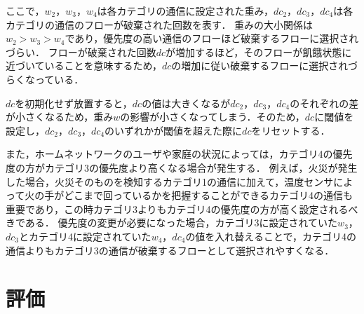 \documentclass[a4paper,11pt,uplatex]{ujreport}
\begin{document}
  ここで，$w_2$，$w_3$，$w_4$は各カテゴリの通信に設定された重み，$dc_2$，$dc_3$，$dc_4$は各カテゴリの通信のフローが破棄された回数を表す．
  重みの大小関係は$w_2 > w_3 > w_4$であり，優先度の高い通信のフローほど破棄するフローに選択されづらい．
  フローが破棄された回数$dc$が増加するほど，そのフローが飢餓状態に近づいていることを意味するため，$dc$の増加に従い破棄するフローに選択されづらくなっている．\par
  $dc$を初期化せず放置すると，$dc$の値は大きくなるが$dc_2$，$dc_3$，$dc_4$のそれぞれの差が小さくなるため，重み$w$の影響が小さくなってしまう．そのため，$dc$に閾値を設定し，$dc_2$，$dc_3$，$dc_4$のいずれかが閾値を超えた際に$dc$をリセットする．\par
  また，ホームネットワークのユーザや家庭の状況によっては，カテゴリ4の優先度の方がカテゴリ3の優先度より高くなる場合が発生する．
  例えば，火災が発生した場合，火災そのものを検知するカテゴリ1の通信に加えて，温度センサによって火の手がどこまで回っているかを把握することができるカテゴリ4の通信も重要であり，この時カテゴリ3よりもカテゴリ4の優先度の方が高く設定されるべきである．
  優先度の変更が必要になった場合，カテゴリ3に設定されていた$w_3$，$dc_3$とカテゴリ4に設定されていた$w_4$，$dc_4$の値を入れ替えることで，カテゴリ4の通信よりもカテゴリ3の通信が破棄するフローとして選択されやすくなる．







\chapter{評価}
\label{chap:評価}
\end{document}
